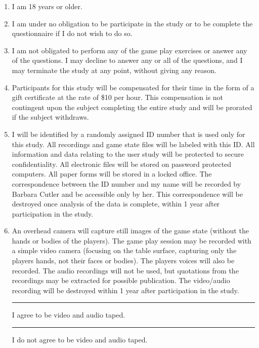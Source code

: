 \documentclass[10pt]{article}
\begin{document}
\begin{enumerate}

\item I am 18 years or older.

\item
I am under no obligation to be participate in the study or to be
  complete the questionnaire if I do not wish to do so.

\item 
I am not obligated to perform any of the game play exercises or
  answer any of the questions.  I may decline to answer any or all of
  the questions, and I may terminate the study at any point, without
  giving any reason.

\item 
Participants for this study will be compensated for their time in the
form of a gift certificate at the rate of \$10 per hour.  This
compensation is not contingent upon the subject completing the entire
study and will be prorated if the subject withdraws.

\item I will be identified by a randomly assigned ID number that is
  used only for this study.  All recordings and game state files will be
  labeled with this ID.  All information and data relating to the user
  study will be protected to secure confidentiality.  All electronic
  files will be stored on password protected computers.  All paper
  forms will be stored in a locked office.  The correspondence
  between the ID number and my name will be recorded by Barbara Cutler
  and be accessible only by her.  This correspondence will be
  destroyed once analysis of the data is complete, within 1 year after
  participation in the study.

\item An overhead camera will capture still images of the game state
  (without the hands or bodies of the players).  The game play session
  may be recorded with a simple video camera (focusing on the table
  surface, capturing only the players hands, not their faces or
  bodies).  The players voices will also be recorded.  The audio
  recordings will not be used, but quotations from the recordings may
  be extracted for possible publication.  The video/audio recording
  will be destroyed within 1 year after participation in the study.\\
\noindent
\hspace*{0.3in} \rule{0.3in}{1pt} I agree to be video and audio taped. \\
\hspace*{0.3in} \rule{0.3in}{1pt} I do not agree to be video and audio taped.


\end{enumerate}
\end{document}
